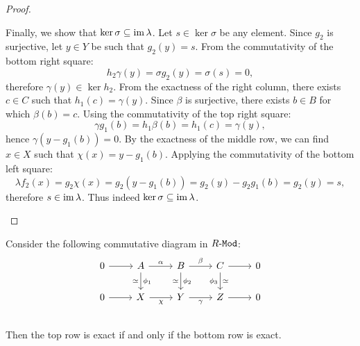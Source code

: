 \begin{proof}
\begin{enumerate}[(a)]
              Finally, we show that \(\ker \sigma \subseteq \operatorname{im} \lambda\). Let
              \(s \in \ker\sigma\) be any element. Since \(g_2\) is surjective, let
              \(y \in Y\) be such that \(g_2(y) = s\). From the commutativity of the bottom
              right square:
              \[
                  h_2 \gamma(y) = \sigma g_2(y) = \sigma(s) = 0,
              \]
              therefore \(\gamma(y) \in \ker h_2\). From the exactness of the right column,
              there exists \(c \in C\) such that \(h_1(c) = \gamma(y)\). Since \(\beta\) is
              surjective, there exists \(b \in B\) for which \(\beta(b) = c\). Using the
              commutativity of the top right square:
              \[
                  \gamma g_1(b) = h_1 \beta(b) = h_1(c) = \gamma(y),
              \]
              hence \(\gamma(y - g_1(b)) = 0\). By the exactness of the middle row, we can
              find \(x \in X\) such that \(\chi(x) = y - g_1(b)\). Applying the
              commutativity of the bottom left square:
              \[
                  \lambda f_2(x) = g_2 \chi(x)
                  = g_2(y - g_1(b)) = g_2(y) - g_2 g_1(b) = g_2(y) = s,
              \]
              therefore \(s \in \operatorname{im} \lambda\). Thus indeed
              \(\ker \sigma \subseteq \operatorname{im} \lambda\).
    \end{enumerate}
\end{proof}

\begin{proposition}
    \label{prop:top-exact-iff-bottom-exact}
    Consider the following commutative diagram in \({R\text{-}\texttt{Mod}}\):
    \[
        \begin{tikzcd}
            0 \ar[r]
            &A \ar[r, "\alpha"] \ar[d, "\dis"', "\phi_1"]
            &B \ar[r, "\beta"]  \ar[d, "\dis"', "\phi_2"]
            &C \ar[r]           \ar[d, "\dis", "\phi_3"']
            &0 \\
            0 \ar[r]
            &X \ar[r, "\chi"']
            &Y \ar[r, "\gamma"']
            &Z \ar[r]
            &0 \\
        \end{tikzcd}
    \]
    Then the top row is exact if and only if the bottom row is exact.
\end{proposition}

